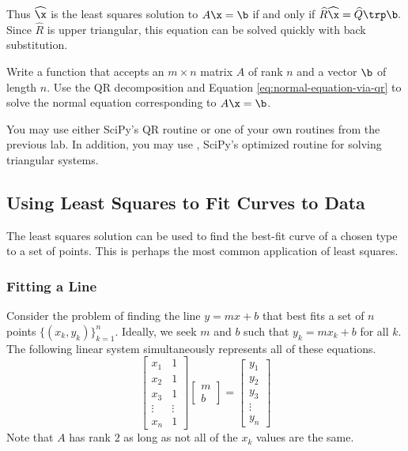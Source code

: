 Thus $\widehat{\x}$ is the least squares solution to $A\x=\b$ if and only if $\widehat{R}\widehat{\x} = \widehat{Q}\trp\b.$
Since $\widehat{R}$ is upper triangular, this equation can be solved quickly with back substitution.

\begin{problem} %
Write a function that accepts an $m \times n$ matrix $A$ of rank $n$ and a vector $\b$ of length $n$.
Use the QR decomposition and Equation \ref{eq:normal-equation-via-qr} to solve the normal equation corresponding to $A\x = \b$.

You may use either SciPy's QR routine or one of your own routines from the previous lab.
In addition, you may use , SciPy's optimized routine for solving triangular systems.

\label{prob:lstsq-via-qr}
\end{problem}

\subsection*{Using Least Squares to Fit Curves to Data} %

The least squares solution can be used to find the best-fit curve of a chosen type to a set of points.
This is perhaps the most common application of least squares.

\subsubsection*{Fitting a Line} %

Consider the problem of finding the line $y = mx + b$ that best fits a set of $n$ points $\{(x_k, y_k)\}_{k=1}^n$.
Ideally, we seek $m$ and $b$ such that $y_k = mx_k + b$ for all $k$.
The following linear system simultaneously represents all of these equations.
%
\begin{equation}
\left[\begin{array}{cc}
x_1 & 1 \\
x_2 & 1 \\
x_3 & 1 \\
\vdots & \vdots \\
x_n & 1
\end{array}\right]
\left[\begin{array}{c} m \\ b \end{array}\right]
=
\left[\begin{array}{c} y_1 \\ y_2 \\ y_3 \\ \vdots \\ y_n \end{array}\right]
\label{eq:linear-least-squares}
\end{equation}
%
Note that $A$ has rank $2$ as long as not all of the $x_k$ values are the same.


